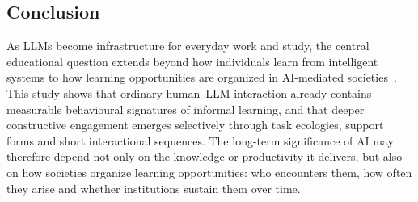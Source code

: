 
\subsection*{Conclusion}

As LLMs become infrastructure for everyday work and study, the central educational question extends beyond how individuals learn from intelligent systems to how learning opportunities are organized in AI-mediated societies~\cite{burton2024collective}. This study shows that ordinary human--LLM interaction already contains measurable behavioural signatures of informal learning, and that deeper constructive engagement emerges selectively through task ecologies, support forms and short interactional sequences.  The long-term significance of AI may therefore depend not only on the knowledge or productivity it delivers, but also on how societies organize learning opportunities: who encounters them, how often they arise and whether institutions sustain them over time.






